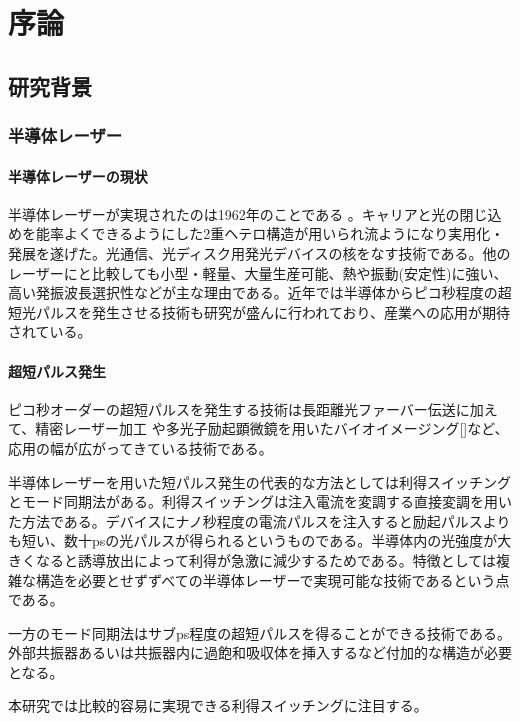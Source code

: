 \chapter{序論}
\section{研究背景}
\subsection{半導体レーザー}
\subsubsection{半導体レーザーの現状}
半導体レーザーが実現されたのは1962年のことである 。キャリアと光の閉じ込めを能率よくできるようにした2重ヘテロ構造が用いられ流ようになり実用化・発展を遂げた。光通信、光ディスク用発光デバイスの核をなす技術である。他のレーザーにと比較しても小型・軽量、大量生産可能、熱や振動(安定性)に強い、高い発振波長選択性などが主な理由である。近年では半導体からピコ秒程度の超短光パルスを発生させる技術も研究が盛んに行われており、産業への応用が期待されている。
\subsubsection{超短パルス発生}
ピコ秒オーダーの超短パルスを発生する技術は長距離光ファーバー伝送\cite{ref_hasegawa}に加えて、精密レーザー加工\cite{ref_chichkov} や多光子励起顕微鏡を用いたバイオイメージング[]など、応用の幅が広がってきている技術である。

半導体レーザーを用いた短パルス発生の代表的な方法としては利得スイッチングとモード同期法がある。利得スイッチング\cite{ref_h_ito}は注入電流を変調する直接変調を用いた方法である。デバイスにナノ秒程度の電流パルスを注入すると励起パルスよりも短い、数十psの光パルスが得られるというものである。半導体内の光強度が大きくなると誘導放出によって利得が急激に減少するためである。特徴としては複雑な構造を必要とせずずべての半導体レーザーで実現可能な技術であるという点である。

一方のモード同期法はサブps程度の超短パルスを得ることができる技術である。外部共振器あるいは共振器内に過飽和吸収体を挿入するなど付加的な構造が必要となる。

本研究では比較的容易に実現できる利得スイッチングに注目する。

